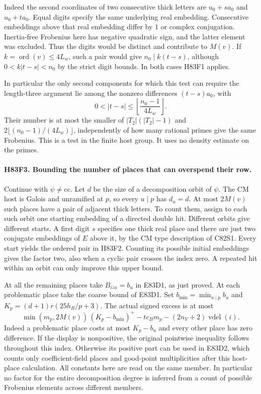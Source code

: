 Indeed the second coordinates of two consecutive thick letters are
$u_0+s a_0$ and $u_0+t a_0$. Equal digits specify the same
underlying real embedding. Consecutive embeddings above that real
embedding differ by $1$ or complex conjugation. Inertia-free
Frobenius here has negative quadratic sign, and the latter element
was excluded. Thus the digits would be distinct and contribute
to $M(v)$. If $k=\operatorname{ord}(v)\le4 L_w$, such a pair
would give $n_0\mid k(t-s)$, although $0<k|t-s|<n_0$ by the
strict digit bounds. In both cases H83F1 applies.

In particular the only second components for which this test can require
the length-three argument lie among the nonzero differences
$(t-s)a_0$, with
\[
 0<|t-s|\le\left\lfloor\frac{n_0-1}{4L_w}\right\rfloor .
\]
Their number is at most the smaller of
$|T_2|(|T_2|-1)$ and $2\lfloor(n_0-1)/(4L_w)\rfloor$,
independently of how many rational primes give the same
Frobenius. This is a test in the finite host group.
It uses no density estimate on the primes.

\paragraph{H83F3. Bounding the number of places that can overspend their row.}
Continue with $\psi\ne\mathrm{cc}$. Let $d$ be the size of a
decomposition orbit of $\psi$. The CM host is Galois and
unramified at $p$, so every $u\mid p$ has $d_u=d$.
At most $2M(v)$ such places have a pair of adjacent thick
letters. To count them, assign to each such orbit one starting
embedding of a directed double hit. Different orbits give
different starts. A first digit $s$ specifies one thick real
place and there are just two conjugate embeddings of $E$ above
it, by the CM type description of C82S1. Every start yields the
ordered pair in H83F2. Counting its possible initial embeddings
gives the factor two, also when a cyclic pair crosses the index
zero. A repeated hit within an orbit can only improve this
upper bound.

At all the remaining places take $B_{izu}=b_u$ in E83D1, as
just proved. At each problematic place take the coarse bound of
E83D1. Set $b_{\min}=\min_{u\mid p} b_u$ and
$K_p=(d+1)r(25h_B/p+3)$. The actual signed excess is at most
\[
 \min(m_p,2M(v))\,(K_p-b_{\min})^+
                   -t c_Bm_p-(2n_V+2)\operatorname{vdel}(i).
\]
Indeed a problematic place costs at most $K_p-b_u$ and every
other place has zero difference. If the display is nonpositive,
the original pointwise inequality follows throughout this index.
Otherwise its positive part can be used in E83D2, which counts
only coefficient-field places and good-point multiplicities
after this host-place calculation. All constants here are read
on the same member. In particular no factor for the entire
decomposition degree is inferred from a count of possible
Frobenius elements across different members.

